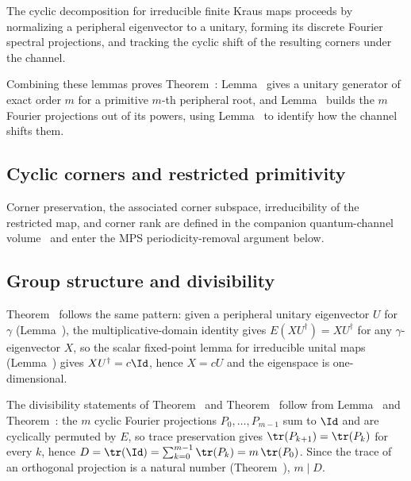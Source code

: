 The cyclic decomposition for irreducible finite Kraus maps proceeds by
normalizing a peripheral eigenvector to a unitary, forming its discrete Fourier
spectral projections, and tracking the cyclic shift of the resulting corners
under the channel.


Combining these lemmas proves Theorem~\cite[``Cyclic decomposition for irreducible finite Kraus maps'']{QICLean2026Blueprint}:
Lemma~\cite[``Normalized peripheral unitary'']{QICLean2026Blueprint} gives a unitary generator of
exact order $m$ for a primitive $m$-th peripheral root, and
Lemma~\cite[``Cyclic projections from a peripheral unitary'']{QICLean2026Blueprint} builds the $m$
Fourier projections out of its powers, using
Lemma~\cite[``Powers on a peripheral-unitary orbit'']{QICLean2026Blueprint} to identify how the channel shifts
them.

\subsection{Cyclic corners and restricted primitivity}

Corner preservation, the associated corner subspace, irreducibility of the
restricted map, and corner rank are defined in the companion quantum-channel
volume~\cite[``Corner preservation'' and the following corner definitions]{QICLean2026Blueprint}
and enter the MPS periodicity-removal argument below.


\subsection{Group structure and divisibility}


Theorem~\cite[``Peripheral eigenspaces are one-dimensional'']{QICLean2026Blueprint} follows the same pattern:
given a peripheral unitary eigenvector $U$ for $\gamma$
(Lemma~\cite[``Peripheral unitary eigenvector'']{QICLean2026Blueprint}), the multiplicative-domain
identity gives $E(XU^\dagger)=XU^\dagger$ for any $\gamma$-eigenvector $X$,
so the scalar fixed-point lemma for irreducible unital maps
(Lemma~\cite[``Scalar fixed points for irreducible unital maps'']{QICLean2026Blueprint}) gives
$XU^\dagger=c\Id$, hence $X=cU$ and the eigenspace is one-dimensional.

The divisibility statements of Theorem~\cite[``Transfer-map peripheral eigenvalues form a cyclic group'']{QICLean2026Blueprint} and
Theorem~\cite[``Transfer-map period divides bond dimension'']{QICLean2026Blueprint} follow from
Lemma~\cite[``Cyclic projections from a peripheral unitary'']{QICLean2026Blueprint} and
Theorem~\cite[``Rank equals trace for an orthogonal projection'']{QICLean2026Blueprint}: the $m$ cyclic Fourier projections
$P_0,\ldots,P_{m-1}$ sum to $\Id$ and are cyclically permuted by $E$, so
trace preservation gives $\tr(P_{k+1})=\tr(P_k)$ for every $k$, hence
$D=\tr(\Id)=\sum_{k=0}^{m-1}\tr(P_k)=m\,\tr(P_0)$. Since the trace of an
orthogonal projection is a natural number (Theorem~\cite[``Rank equals trace for an orthogonal projection'']{QICLean2026Blueprint}),
$m\mid D$.

